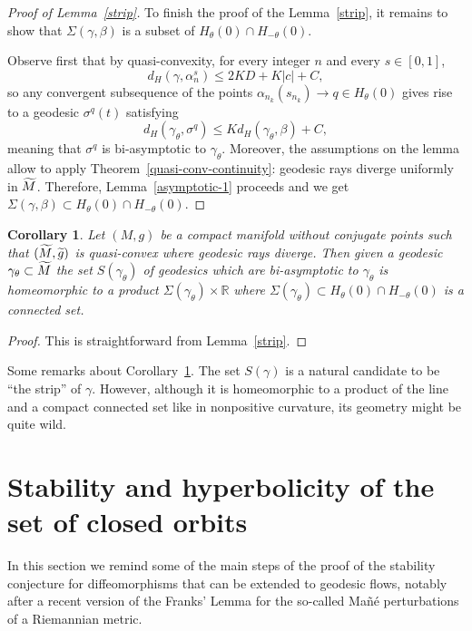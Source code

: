 \documentclass[10pt]{amsart}
\newtheorem{coro}[cdrthm]{Corollary}
\theoremstyle{definition}
\newcommand{\bbR}{\mathbb{R}}
\let\oldtilde\tilde
\renewcommand*{\tilde}[1]{\mathchoice{\widetilde{#1}}{\widetilde{#1}}{\oldtilde{#1}}{\oldtilde{#1}}}
\begin{document}
\begin{proof}[Proof of Lemma~\ref{strip}]
To finish the proof of the Lemma~\ref{strip}, it remains to show that $\Sigma(\gamma,
\beta)$ is a subset of $H_{\theta}(0)\cap H_{-\theta}(0)$.

Observe first that by quasi-convexity, for every integer $n$ and every $s\in [0,1]$,
\[
d_{H}\left(\gamma,\alpha_n^s\right) \leq 2KD + K|c| +C,
\]
so any convergent subsequence of the points $\alpha_{n_{k}}(s_{n_{k}}) \rightarrow q \in H_{\theta}(0)$ gives rise to a geodesic $\sigma^{q}(t)$ satisfying
\[
d_{H}(\gamma_{\theta}, \sigma^{q}) \leq K d_{H}(\gamma_{\theta}, \beta) +C,
\]
meaning that $\sigma^{q}$ is bi-asymptotic to $\gamma_{\theta}$. Moreover, the assumptions on the lemma allow to apply Theorem~\ref{quasi-conv-continuity}: geodesic rays diverge uniformly in $\tilde{M}$. Therefore, Lemma~\ref{asymptotic-1} proceeds and we get $\Sigma(\gamma, \beta) \subset H_{\theta}(0)\cap H_{-\theta}(0)$.
\end{proof}

\begin{coro}\label{connected-strip}
Let $(M,g)$ be a compact manifold without conjugate points such that $(\tilde{M}, \tilde{g})$ is quasi-convex where geodesic rays diverge. Then given a geodesic $\gamma_{\theta} \subset \tilde{M}$ the set $S(\gamma_{\theta})$ of geodesics which are bi-asymptotic to $\gamma_{\theta}$ is homeomorphic to a product $\Sigma(\gamma_{\theta}) \times \bbR$ where $\Sigma(\gamma_{\theta}) \subset H_{\theta}(0)\cap H_{-\theta}(0)$ is a connected set.
\end{coro}

\begin{proof}
This is straightforward from Lemma~\ref{strip}.
\end{proof}

Some remarks about Corollary~\ref{connected-strip}. The set $S(\gamma)$ is a natural candidate to be ``the strip'' of $\gamma$. However, although it is homeomorphic to a product of the line and a compact connected set like in nonpositive curvature, its geometry might be quite wild.

\section{Stability and hyperbolicity of the set of closed orbits}\label{SECclosedorbits}

In this section we remind some of the main steps of the proof of the stability conjecture for diffeomorphisms that can be extended to geodesic flows, notably after a recent version of the Franks' Lemma for the so-called Mañé perturbations of a Riemannian metric.
\end{document}

